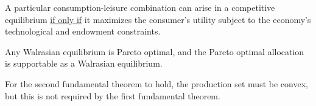 \documentclass{report}
\begin{document}
			\begin{remark}
				A particular consumption-leisure combination can arise in a competitive equilibrium \ul{if only if} it maximizes the consumer's utility subject to the economy's technological and endowment constraints.
			\end{remark}
			
			\begin{corollary}
				Any Walrasian equilibrium is Pareto optimal, and the Pareto optimal allocation is supportable as a Walrasian equilibrium.
			\end{corollary}
			
			\begin{remark}
				For the second fundamental theorem to hold, the production set must be convex, but this is not required by the first fundamental theorem.
			\end{remark}
			
\end{document}
